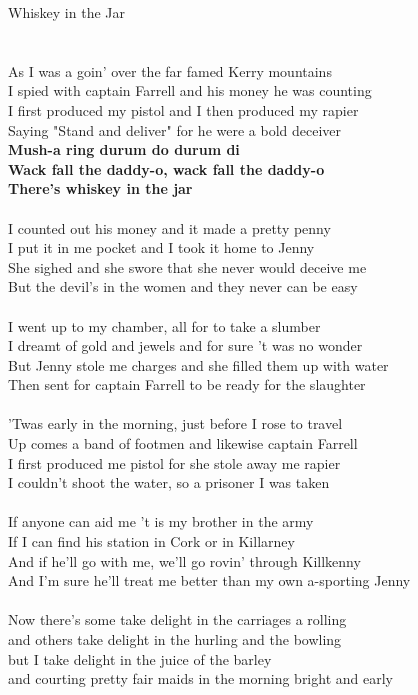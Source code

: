 \documentclass[letterpaper,9pt]{article}
\begin{document}
\newpage
{}
\huge
Whiskey in the Jar\\
\\
\Large
\\As I was a goin' over the far famed Kerry mountains
\\I spied with captain Farrell and his money he was counting
\\I first produced my pistol and I then produced my rapier
\\Saying "Stand and deliver" for he were a bold deceiver
\\\textbf{Mush-a ring durum do durum di
\\Wack fall the daddy-o, wack fall the daddy-o
\\There's whiskey in the jar}
\\
\\I counted out his money and it made a pretty penny
\\I put it in me pocket and I took it home to Jenny
\\She sighed and she swore that she never would deceive me
\\But the devil's in the women and they never can be easy
\\
\\I went up to my chamber, all for to take a slumber
\\I dreamt of gold and jewels and for sure 't was no wonder
\\But Jenny stole me charges and she filled them up with water
\\Then sent for captain Farrell to be ready for the slaughter
\\
\\'Twas early in the morning, just before I rose to travel
\\Up comes a band of footmen and likewise captain Farrell
\\I first produced me pistol for she stole away me rapier
\\I couldn't shoot the water, so a prisoner I was taken
\\
\\If anyone can aid me 't is my brother in the army
\\If I can find his station in Cork or in Killarney
\\And if he'll go with me, we'll go rovin' through Killkenny
\\And I'm sure he'll treat me better than my own a-sporting Jenny
\\
\\Now there's some take delight in the carriages a rolling
\\and others take delight in the hurling and the bowling
\\but I take delight in the juice of the barley
\\and courting pretty fair maids in the morning bright and early
\end{document}
